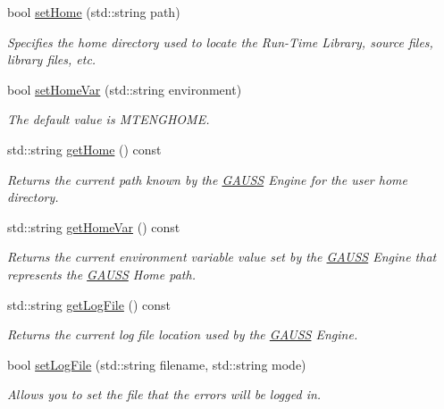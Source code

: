 \begin{DoxyCompactItemize}
bool \hyperlink{class_g_a_u_s_s_ac34645a05f3aca7d56d11d0b895fb33a}{set\-Home} (std\-::string path)
\begin{DoxyCompactList}\small\item\em Specifies the home directory used to locate the Run-\/\-Time Library, source files, library files, etc. \end{DoxyCompactList}\item 
bool \hyperlink{class_g_a_u_s_s_ad2935b18b45d55903bb5025143dffab4}{set\-Home\-Var} (std\-::string environment)
\begin{DoxyCompactList}\small\item\em The default value is {\ttfamily M\-T\-E\-N\-G\-H\-O\-M\-E}. \end{DoxyCompactList}\item 
std\-::string \hyperlink{class_g_a_u_s_s_adcf22078395b4d6e52d2db9e2bd7c5eb}{get\-Home} () const 
\begin{DoxyCompactList}\small\item\em Returns the current path known by the \hyperlink{class_g_a_u_s_s}{G\-A\-U\-S\-S} Engine for the user home directory. \end{DoxyCompactList}\item 
std\-::string \hyperlink{class_g_a_u_s_s_aa62e75f033a866ac941890d334178d42}{get\-Home\-Var} () const 
\begin{DoxyCompactList}\small\item\em Returns the current environment variable value set by the \hyperlink{class_g_a_u_s_s}{G\-A\-U\-S\-S} Engine that represents the \hyperlink{class_g_a_u_s_s}{G\-A\-U\-S\-S} Home path. \end{DoxyCompactList}\item 
std\-::string \hyperlink{class_g_a_u_s_s_af0f85635c7c5b614834af3f6276349b5}{get\-Log\-File} () const 
\begin{DoxyCompactList}\small\item\em Returns the current log file location used by the \hyperlink{class_g_a_u_s_s}{G\-A\-U\-S\-S} Engine. \end{DoxyCompactList}\item 
bool \hyperlink{class_g_a_u_s_s_aeec13d5fa3abe9e9b7836cee87edf5b8}{set\-Log\-File} (std\-::string filename, std\-::string mode)
\begin{DoxyCompactList}\small\item\em Allows you to set the file that the errors will be logged in. \end{DoxyCompactList}\item 

\end{DoxyCompactItemize}
